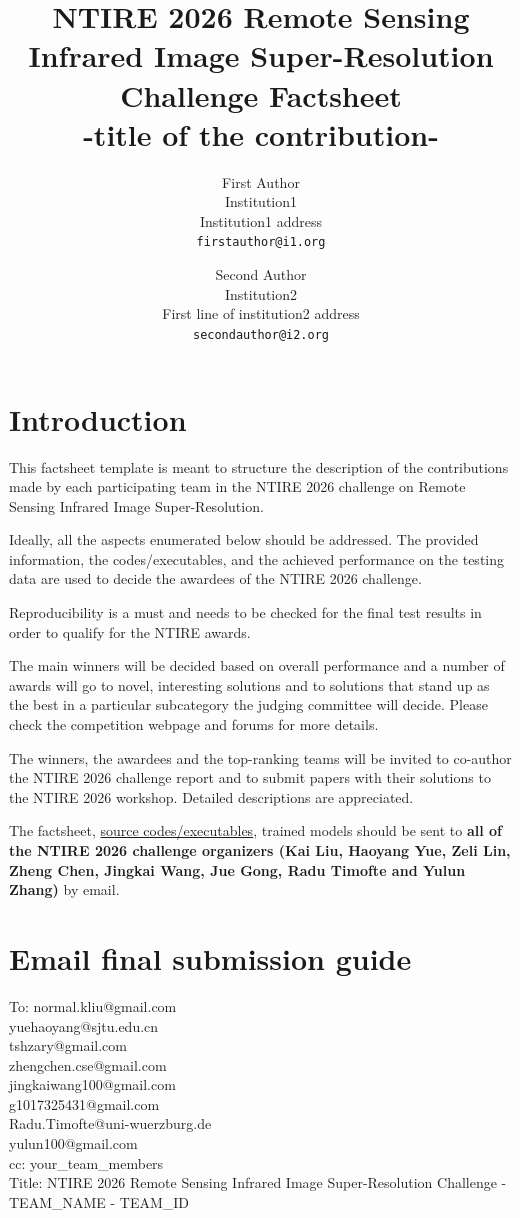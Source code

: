 \documentclass[10pt,twocolumn,letterpaper]{article}
\title{NTIRE 2026 Remote Sensing Infrared Image Super-Resolution Challenge Factsheet\\-title of the contribution-}
\author{First Author\\
Institution1\\
Institution1 address\\
{\tt\small firstauthor@i1.org}
\and
Second Author\\
Institution2\\
First line of institution2 address\\
{\tt\small secondauthor@i2.org}
}
\begin{document}
\maketitle

\section{Introduction}

This factsheet template is meant to structure the description of the contributions made by each participating team in the NTIRE 2026 challenge on Remote Sensing Infrared Image Super-Resolution. 

Ideally, all the aspects enumerated below should be addressed.
The provided information, the codes/executables, and the achieved performance on the testing data are used to decide the awardees of the NTIRE 2026 challenge. 

Reproducibility is a must and needs to be checked for the final test results in order to qualify for the NTIRE awards. 

The main winners will be decided based on overall performance and a number of awards will go to novel, interesting solutions and to solutions that stand up as the best in a particular subcategory the judging committee will decide. Please check the competition webpage and forums for more details.

The winners, the awardees and the top-ranking teams will be invited to co-author the NTIRE 2026 challenge report and to submit papers with their solutions to the NTIRE 2026 workshop. Detailed descriptions are appreciated.

The factsheet, \href{https://github.com/zhengchen1999/NTIRE2026_RemoteSensing_Infrared_SR}{source codes/executables}, trained models should be sent to \textbf{all of the NTIRE 2026 challenge organizers (Kai Liu, Haoyang Yue, Zeli Lin, Zheng Chen, Jingkai Wang, Jue Gong, Radu Timofte and Yulun Zhang)} by email.

\section{Email final submission guide}

\noindent To: 
{normal.kliu@gmail.com}\\ %
{yuehaoyang@sjtu.edu.cn}\\ %
{tshzary@gmail.com}\\ %
{zhengchen.cse@gmail.com}\\ %
{jingkaiwang100@gmail.com}\\ %
{g1017325431@gmail.com}\\ %
{Radu.Timofte@uni-wuerzburg.de}\\ %
{yulun100@gmail.com}\\
\noindent cc: your\_team\_members\\
Title: NTIRE 2026 Remote Sensing Infrared Image Super-Resolution Challenge - TEAM\_NAME - TEAM\_ID\\
\end{document}
